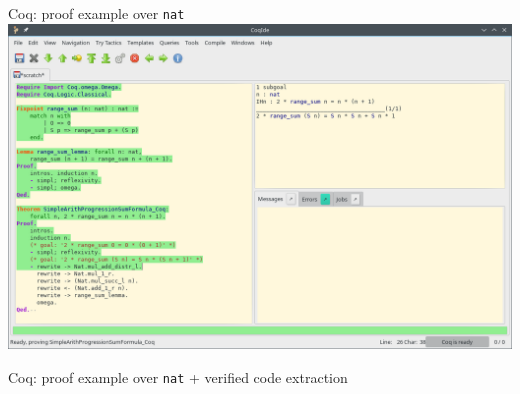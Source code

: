 \documentclass[aspectratio=169, 12pt, fleqn]{beamer}
\begin{document}
\begin{frame}{Coq: proof example over \texttt{nat}}
\includegraphics[scale=0.39]{img/gif-coq/coq-arith-6.png}
\end{frame}


\begin{frame}{Coq: proof example over \texttt{nat} + verified code extraction}

\begin{figure}
\end{figure}

\end{frame}
\end{document}
